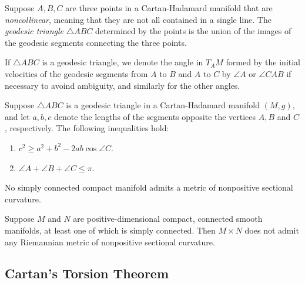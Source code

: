 \begin{definition}
  \label{definition-geodesic-triangle}
  Suppose \( A, B, C \) are three points in a Cartan-Hadamard manifold that are \emph{noncollinear}, meaning that they are not all contained in a single line.
  The \emph{geodesic triangle} \( \triangle ABC \) determined by the points is the union of the images of the geodesic segments connecting the three points.

  If \( \triangle ABC \) is a geodesic triangle, we denote the angle in \( T_A M \) formed by the initial velocities of the geodesic segments from \( A \) to \( B \) and \( A \) to \( C \) by \( \angle A \) or \( \angle CAB \) if necessary to avoind ambiguity, and similarly for the other angles.
\end{definition}

\begin{proposition}
  \label{proposition-cosine-theorem}
  Suppose \( \triangle ABC \) is a geodesic triangle in a Cartan-Hadamard manifold \( (M, g) \), and let \( a, b, c \) denote the lengths of the segments opposite the vertices \( A, B \) and \( C \), respectively.
  The following inequalities hold:
  \begin{enumerate}
    \item \( c^2 \geq a^2 + b^2 - 2ab \cos \angle C \).
    \item \( \angle A + \angle B + \angle C \leq \pi \).
  \end{enumerate}
\end{proposition}

\begin{corollary}
  \label{corollary-nonpositive-sectional-curvature-1}
  No simply connected compact manifold admits a metric of nonpositive sectional curvature.
\end{corollary}

\begin{corollary}
  \label{corollary-nonpositive-sectional-curvature-2}
  Suppose \( M \) and \( N \) are positive-dimensional compact, connected smooth manifolds, at least one of which is simply connected.
  Then \( M \times N \) does not admit any Riemannian metric of nonpositive sectional curvature.
\end{corollary}


\subsection{Cartan's Torsion Theorem}
\label{subsection-Cartan-torsion-theorem}

